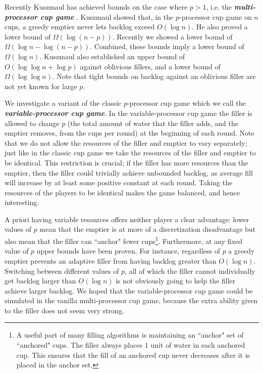 \documentclass[twocolumn]{article}[10pt]
\newcommand{\defn}[1]{{\textit{\textbf{\boldmath #1}}}\xspace}
\renewcommand{\paragraph}[1]{\vspace{0.09in}\noindent{\bf \boldmath #1.}}
\begin{document}
Recently Kuszmaul has achieved bounds on the case where $p>1$, i.e. the
\defn{multi-processor cup game} \cite{wku20}. Kuszmaul showed that, in the 
$p$-processor cup game on $n$ cups, a greedy emptier never lets backlog exceed
$O(\log n)$. He also proved a lower bound of $\Omega(\log (n-p))$. Recently we
showed a lower bound of $\Omega(\log n - \log (n-p))$. Combined, these bounds
imply a lower bound of $\Omega(\log n)$.
Kuszmaul also established an upper bound of $O(\log\log n + \log p)$ against
oblivious fillers, and a lower bound of $\Omega(\log\log n)$. Note that tight
bounds on backlog against an oblivious filler are not yet known for large $p$.

\paragraph{Our Variant}
We investigate a variant of the classic $p$-processor cup game which we call
the \defn{variable-processor cup game}. In the variable-processor cup game the
filler is allowed to change $p$ (the total amount of water that the filler
adds, and the emptier removes, from the cups per round) at the beginning of
each round. Note that we do not allow the resources of the filler and emptier
to vary separately; just like in the classic cup game we take the resources of
the filler and emptier to be identical.
This restriction is crucial; if
the filler has more resources than the emptier, then
the filler could trivially achieve unbounded backlog, as average fill will
increase by at least some positive constant at each round.
Taking the resources of the players to be identical makes the game balanced,
and hence interesting.

A priori having variable resources offers neither player a clear advantage:
lower values of $p$ mean that the emptier is at more of a discretization
disadvantage but also mean that the filler can ``anchor" fewer cups\footnote{A
useful part of many filling algorithms is maintaining an ``anchor" set of
``anchored" cups. The filler always places $1$ unit of water in each anchored
cup. This ensures that the fill of an anchored cup never decreases after it is
placed in the anchor set.}. Furthermore, at any fixed value of $p$ upper bounds
have been proven. For instance, regardless of $p$ a greedy emptier prevents an
adaptive filler from having backlog greater than $O(\log n)$. Switching between
different values of $p$, all of which the filler cannot individually get
backlog larger than $O(\log n)$ is not obviously going to help the filler achieve larger backlog.
We hoped that the variable-processor cup game could
be simulated in the vanilla multi-processor cup game, because the extra
ability given to the filler does not seem very strong. 
\end{document}
